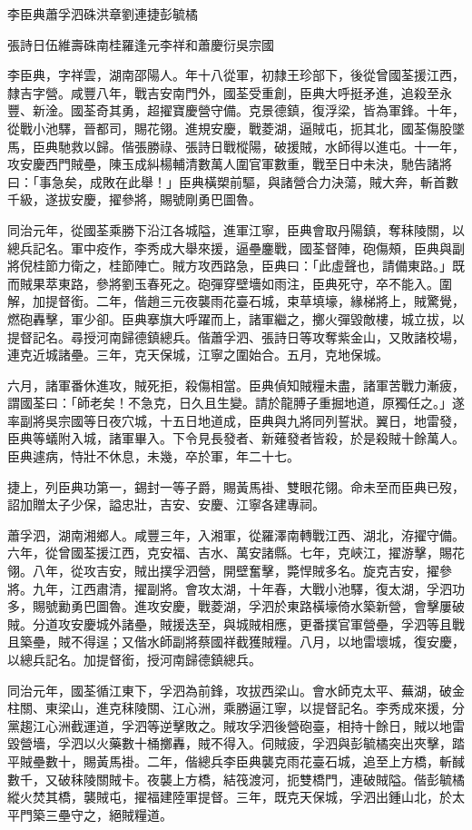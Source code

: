 
\begin{pinyinscope}
李臣典蕭孚泗硃洪章劉連捷彭毓橘

張詩日伍維壽硃南桂羅逢元李祥和蕭慶衍吳宗國

李臣典，字祥雲，湖南邵陽人。年十八從軍，初隸王珍部下，後從曾國荃援江西，隸吉字營。咸豐八年，戰吉安南門外，國荃受重創，臣典大呼挺矛進，追殺至永豐、新淦。國荃奇其勇，超擢寶慶營守備。克景德鎮，復浮梁，皆為軍鋒。十年，從戰小池驛，晉都司，賜花翎。進規安慶，戰菱湖，逼賊屯，扼其北，國荃傷股墜馬，臣典馳救以歸。偕張勝祿、張詩日戰樅陽，破援賊，水師得以進屯。十一年，攻安慶西門賊壘，陳玉成糾楊輔清數萬人圍官軍數重，戰至日中未決，馳告諸將曰：「事急矣，成敗在此舉！」臣典橫槊前驅，與諸營合力決蕩，賊大奔，斬首數千級，遂拔安慶，擢參將，賜號剛勇巴圖魯。

同治元年，從國荃乘勝下沿江各城隘，進軍江寧，臣典會取丹陽鎮，奪秣陵關，以總兵記名。軍中疫作，李秀成大舉來援，逼壘鏖戰，國荃督陣，砲傷頰，臣典與副將倪桂節力衛之，桂節陣亡。賊方攻西路急，臣典曰：「此虛聲也，請備東路。」既而賊果萃東路，參將劉玉春死之。砲彈穿壁墻如雨注，臣典死守，卒不能入。圍解，加提督銜。二年，偕趙三元夜襲雨花臺石城，束草填壕，緣梯將上，賊驚覺，燃砲轟擊，軍少卻。臣典搴旗大呼躍而上，諸軍繼之，擲火彈毀敵樓，城立拔，以提督記名。尋授河南歸德鎮總兵。偕蕭孚泗、張詩日等攻奪紫金山，又敗諸校場，連克近城諸壘。三年，克天保城，江寧之圍始合。五月，克地保城。

六月，諸軍番休進攻，賊死拒，殺傷相當。臣典偵知賊糧未盡，諸軍苦戰力漸疲，謂國荃曰：「師老矣！不急克，日久且生變。請於龍膊子重掘地道，原獨任之。」遂率副將吳宗國等日夜穴城，十五日地道成，臣典與九將同列誓狀。翼日，地雷發，臣典等蟻附入城，諸軍畢入。下令見長發者、新薙發者皆殺，於是殺賊十餘萬人。臣典遽病，恃壯不休息，未幾，卒於軍，年二十七。

捷上，列臣典功第一，錫封一等子爵，賜黃馬褂、雙眼花翎。命未至而臣典已歿，詔加贈太子少保，謚忠壯，吉安、安慶、江寧各建專祠。

蕭孚泗，湖南湘鄉人。咸豐三年，入湘軍，從羅澤南轉戰江西、湖北，洊擢守備。六年，從曾國荃援江西，克安福、吉水、萬安諸縣。七年，克峽江，擢游擊，賜花翎。八年，從攻吉安，賊出撲孚泗營，開壁奮擊，斃悍賊多名。旋克吉安，擢參將。九年，江西肅清，擢副將。會攻太湖，十年春，大戰小池驛，復太湖，孚泗功多，賜號勷勇巴圖魯。進攻安慶，戰菱湖，孚泗於東路橫壕倚水築新營，會擊屢破賊。分道攻安慶城外諸壘，賊援迭至，與城賊相應，更番撲官軍營壘，孚泗等且戰且築壘，賊不得逞；又偕水師副將蔡國祥截獲賊糧。八月，以地雷壞城，復安慶，以總兵記名。加提督銜，授河南歸德鎮總兵。

同治元年，國荃循江東下，孚泗為前鋒，攻拔西梁山。會水師克太平、蕪湖，破金柱關、東梁山，進克秣陵關、江心洲，乘勝逼江寧，以提督記名。李秀成來援，分黨趨江心洲截運道，孚泗等逆擊敗之。賊攻孚泗後營砲臺，相持十餘日，賊以地雷毀營墻，孚泗以火藥數十桶擲轟，賊不得入。伺賊疲，孚泗與彭毓橘突出夾擊，踏平賊壘數十，賜黃馬褂。二年，偕總兵李臣典襲克雨花臺石城，追至上方橋，斬馘數千，又破秣陵關賊卡。夜襲上方橋，結筏渡河，扼雙橋門，連破賊隘。偕彭毓橘縱火焚其橋，襲賊屯，擢福建陸軍提督。三年，既克天保城，孚泗出鍾山北，於太平門築三壘守之，絕賊糧道。


\end{pinyinscope}
